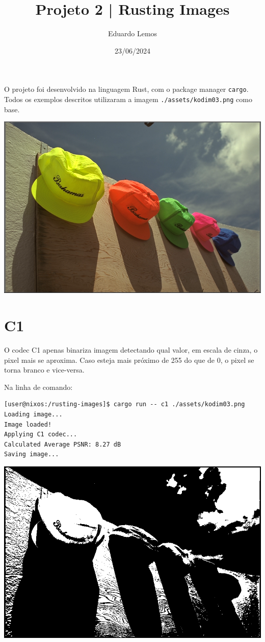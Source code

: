 \documentclass[11pt]{article}
\author{Eduardo Lemos}
\date{23/06/2024}
\title{Projeto 2 | Rusting Images}
\begin{document}
\maketitle
\tableofcontents

O projeto foi desenvolvido na linguagem Rust, com o package manager \texttt{cargo}.
Todos os exemplos descritos utilizaram a imagem \texttt{./assets/kodim03.png} como base.

\begin{center}
\includegraphics[height=0.4\textwidth]{../assets/kodim03.png}
\end{center}

\section{C1}
\label{sec:org92e68be}

O codec C1 apenas binariza imagem detectando qual valor, em escala de cinza, o pixel mais se aproxima. Caso
esteja mais próximo de 255 do que de 0, o pixel se torna branco e vice-versa.

Na linha de comando:

\begin{verbatim}
[user@nixos:/rusting-images]$ cargo run -- c1 ./assets/kodim03.png
Loading image...
Image loaded!
Applying C1 codec...
Calculated Average PSNR: 8.27 dB
Saving image...
\end{verbatim}

\begin{center}
\includegraphics[height=0.4\textwidth]{../assets/kodim03_c1.png}
\end{center}
\end{document}
